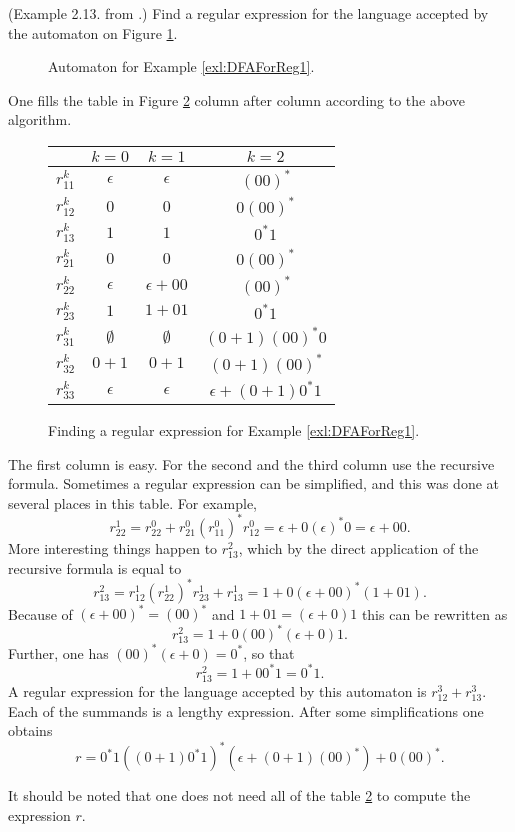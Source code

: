 

\setcounter{section}{2}
\setcounter{subsection}{2}
\setcounter{dfn}{10}

\begin{exl}
\label{exl:DFAForReg1}
(Example 2.13. from \cite{HU79}.)
Find a regular expression for the language accepted by the automaton on Figure \ref{fig:DFAForReg1}.
\begin{figure}[ht]
\begin{center}

\end{center}
\caption{Automaton for Example \ref{exl:DFAForReg1}.}
\label{fig:DFAForReg1}
\end{figure}

One fills the table in Figure \ref{fig:TableRegExp} column after column according to the above algorithm.

\begin{figure}[ht]
\begin{center}
\begin{tabular}{c|ccc}
& $k=0$ & $k=1$ & $k=2$\\
\hline
$r_{11}^k$ & $\epsilon$ & $\epsilon$ & $(00)^*$\\
$r_{12}^k$ & $0$ & $0$ & $0(00)^*$\\
$r_{13}^k$ & $1$ & $1$ & $0^*1$\\
$r_{21}^k$ & $0$ & $0$ & $0(00)^*$\\
$r_{22}^k$ & $\epsilon$ & $\epsilon + 00$ & $(00)^*$\\
$r_{23}^k$ & $1$ & $1 + 01$ & $0^*1$\\
$r_{31}^k$ & $\emptyset$ & $\emptyset$ & $(0+1)(00)^*0$\\
$r_{32}^k$ & $0+1$ & $0+1$ & $(0+1)(00)^*$\\
$r_{33}^k$ & $\epsilon$ & $\epsilon$ & $\epsilon + (0+1)0^*1$
\end{tabular}
\end{center}
\caption{Finding a regular expression for Example \ref{exl:DFAForReg1}.}
\label{fig:TableRegExp}
\end{figure}

The first column is easy.
For the second and the third column use the recursive formula.
Sometimes a regular expression can be simplified, and this was done at several places in this table.
For example,
\[
r_{22}^1 = r_{22}^0 + r_{21}^0(r_{11}^0)^*r_{12}^0 = \epsilon + 0(\epsilon)^*0 = \epsilon + 00.
\]
More interesting things happen to $r_{13}^2$, which by the direct application of the recursive formula is equal to
\[
r_{13}^2 = r_{12}^1(r_{22}^1)^*r_{23}^1 + r_{13}^1 = 1+ 0(\epsilon + 00)^*(1+01).
\]
Because of $(\epsilon + 00)^* = (00)^*$ and $1+01 = (\epsilon + 0)1$ this can be rewritten as
\[
r_{13}^2 = 1 + 0(00)^*(\epsilon + 0)1.
\]
Further, one has $(00)^*(\epsilon + 0) = 0^*$, so that
\[
r_{13}^2 = 1 + 00^*1 = 0^*1.
\]
A regular expression for the language accepted by this automaton is $r_{12}^3 + r_{13}^3$.
Each of the summands is a lengthy expression. After some simplifications one obtains
\[
r = 0^*1((0+1)0^*1)^*(\epsilon+(0+1)(00)^*) + 0(00)^*.
\]

It should be noted that one does not need all of the table \ref{fig:TableRegExp} to compute the expression $r$.
\end{exl}



